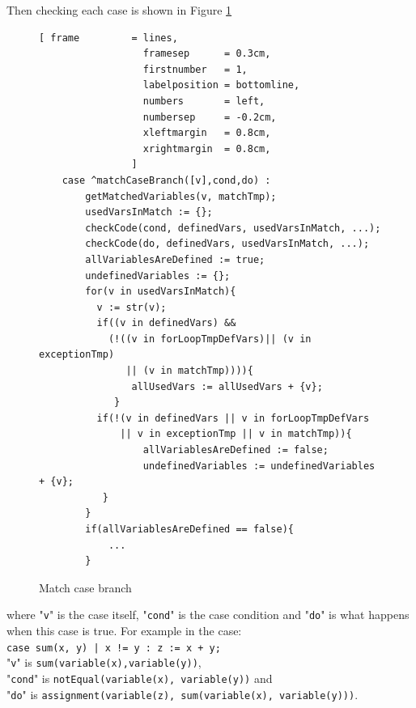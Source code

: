 \documentclass[11pt]{report}
\begin{document}
Then checking each case is shown in Figure \ref{fig:matchCaseBranch}
\begin{figure}[!htb]
\centering
\begin{Verbatim}[ frame         = lines, 
                  framesep      = 0.3cm, 
                  firstnumber   = 1,
                  labelposition = bottomline,
                  numbers       = left,
                  numbersep     = -0.2cm,
                  xleftmargin   = 0.8cm,
                  xrightmargin  = 0.8cm,
                ]
    case ^matchCaseBranch([v],cond,do) : 
		getMatchedVariables(v, matchTmp);
		usedVarsInMatch := {};
		checkCode(cond, definedVars, usedVarsInMatch, ...);
		checkCode(do, definedVars, usedVarsInMatch, ...);
		allVariablesAreDefined := true;
		undefinedVariables := {};
		for(v in usedVarsInMatch){
   		  v := str(v);
   		  if((v in definedVars) && 
   		    (!((v in forLoopTmpDefVars)|| (v in exceptionTmp) 
   		       || (v in matchTmp)))){
      	     	allUsedVars := allUsedVars + {v};
		     }
   		  if(!(v in definedVars || v in forLoopTmpDefVars 
   		      || v in exceptionTmp || v in matchTmp)){
      		      allVariablesAreDefined := false;
      		      undefinedVariables := undefinedVariables + {v};
  		   }
		}
		if(allVariablesAreDefined == false){
		    ...
		}
\end{Verbatim}
\vspace*{-0.3cm}
\caption{Match case branch}
\label{fig:matchCaseBranch}
\end{figure}
where "\texttt{v}" is the case itself, "\texttt{cond}" is the case condition and "\texttt{do}" is what happens when this case is true. For example in the case: 
\\[0.2cm]
\hspace*{0.6cm}
\texttt{case sum(x, y) | x != y : z := x + y;}
\\[0.2cm]
"\texttt{v}" is \texttt{sum(variable(x),variable(y))},\\ "\texttt{cond}" is \texttt{notEqual(variable(x), variable(y))} and\\
"\texttt{do}" is \texttt{assignment(variable(z), sum(variable(x), variable(y)))}.
\end{document}
